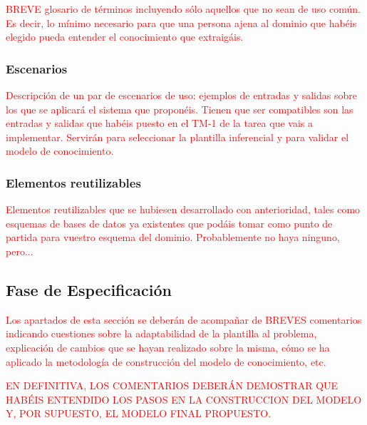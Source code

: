 \documentclass[12pt,a4paper,twoside,spanish]{article}      %
\begin{document}
\textcolor {red} {BREVE glosario de términos incluyendo sólo aquellos que no sean de uso común. Es decir, lo mínimo necesario para que una persona ajena al dominio que habéis elegido pueda entender el conocimiento que extraigáis.}

\subsubsection{Escenarios}

\textcolor {red} {Descripción de un par de escenarios de uso: ejemplos de entradas y salidas sobre los que se aplicará el sistema que proponéis. Tienen que ser compatibles son las entradas y salidas que habéis puesto en el TM-1 de la tarea que vais a implementar. Servirán para seleccionar la plantilla inferencial y para validar el modelo de conocimiento.}

\subsubsection{Elementos reutilizables}

\textcolor {red} {Elementos reutilizables que se hubiesen desarrollado con anterioridad, tales como esquemas de bases de datos ya existentes que podáis tomar como punto de partida para vuestro esquema del dominio. Probablemente no haya ninguno, pero...}


\subsection{Fase de Especificación}

\textcolor {red} {Los apartados de esta sección  se deberán de acompañar de BREVES comentarios indicando cuestiones sobre la adaptabilidad de la plantilla al problema, explicación de cambios que se hayan realizado sobre la misma, cómo se ha aplicado la metodología de construcción del modelo de conocimiento, etc.}

\textcolor {red} {EN DEFINITIVA, LOS COMENTARIOS DEBERÁN DEMOSTRAR QUE HABÉIS ENTENDIDO LOS PASOS EN LA CONSTRUCCION DEL MODELO Y, POR SUPUESTO, EL MODELO FINAL PROPUESTO.}
\end{document}
